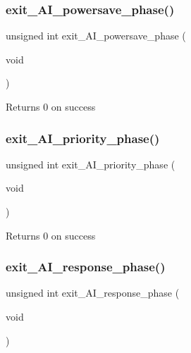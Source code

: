 \subsubsection{\texorpdfstring{exit\+\_\+\+A\+I\+\_\+powersave\+\_\+phase()}{exit\_AI\_powersave\_phase()}}
{\footnotesize\ttfamily unsigned int exit\+\_\+\+A\+I\+\_\+powersave\+\_\+phase (\begin{DoxyParamCaption}\item[{void}]{ }\end{DoxyParamCaption})}

\begin{DoxyReturn}{Returns}
0 on success 
\end{DoxyReturn}
\mbox{\label{group__phase__functions_gad0d0b1ac3bd2b368ecb4d534c85a0a71}} 
\subsubsection{\texorpdfstring{exit\+\_\+\+A\+I\+\_\+priority\+\_\+phase()}{exit\_AI\_priority\_phase()}}
{\footnotesize\ttfamily unsigned int exit\+\_\+\+A\+I\+\_\+priority\+\_\+phase (\begin{DoxyParamCaption}\item[{void}]{ }\end{DoxyParamCaption})}

\begin{DoxyReturn}{Returns}
0 on success 
\end{DoxyReturn}
\mbox{\label{group__phase__functions_ga1d39d9724fbcc5a756fbdaf6c8da4d2e}} 
\subsubsection{\texorpdfstring{exit\+\_\+\+A\+I\+\_\+response\+\_\+phase()}{exit\_AI\_response\_phase()}}
{\footnotesize\ttfamily unsigned int exit\+\_\+\+A\+I\+\_\+response\+\_\+phase (\begin{DoxyParamCaption}\item[{void}]{ }\end{DoxyParamCaption})}

